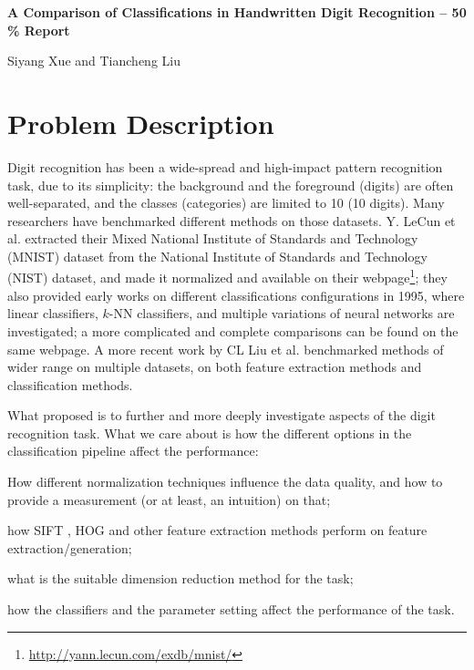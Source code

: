 \documentclass[12pt]{article}
\newenvironment{nscenter}
 {\parskip=0pt\par\nopagebreak\centering}
 {\par\noindent\ignorespacesafterend}
\begin{document}
\thispagestyle{empty}

\bigskip
\bigskip

\begin{nscenter}
\textbf{\Large{A Comparison of Classifications in Handwritten Digit Recognition -- 50 \% Report}}
\end{nscenter}

\bigskip

\begin{nscenter}
{Siyang Xue and Tiancheng Liu}
\end{nscenter}


\section{Problem Description}
\label{sec:problem}


Digit recognition has been a wide-spread and high-impact pattern recognition task, due to its simplicity: the background and the foreground (digits) are often well-separated, and the classes (categories) are limited to 10 (10 digits). Many researchers have benchmarked different methods on those datasets. Y. LeCun et al.\cite{lecun1998gradient} extracted their Mixed National Institute of Standards and Technology (MNIST) dataset from the National Institute of Standards and Technology (NIST) dataset, and made it normalized and available on their webpage\footnote{\url{http://yann.lecun.com/exdb/mnist/}}; they also provided early works on different classifications configurations in 1995, where linear classifiers, $k$-NN classifiers, and multiple variations of neural networks are investigated; a more complicated and complete comparisons can be found on the same webpage. A more recent work by CL Liu et al.\cite{liu2003handwritten} benchmarked methods of wider range on multiple datasets, on both feature extraction methods and classification methods.

What proposed is to further and more deeply investigate aspects of the digit recognition task. What we care about is how the different options in the classification pipeline affect the performance:
\begin{inparaenum} 
\item How different normalization techniques influence the data quality, and how to provide a measurement (or at least, an intuition) on that;
\item how SIFT \cite{lowe2004distinctive}, HOG \cite{dalal2005histograms} and other feature extraction methods perform on feature extraction/generation; 
\item what is the suitable dimension reduction method for the task;
\item how the classifiers and the parameter setting affect the performance of the task.
\end{inparaenum} 
\end{document}
